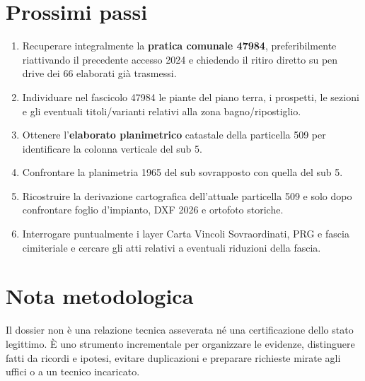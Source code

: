 \documentclass[11pt,a4paper]{article}
\begin{document}
\section{Prossimi passi}
\begin{enumerate}[leftmargin=*]
\item Recuperare integralmente la \textbf{pratica comunale 47984}, preferibilmente riattivando il precedente accesso 2024 e chiedendo il ritiro diretto su pen drive dei 66 elaborati già trasmessi.
\item Individuare nel fascicolo 47984 le piante del piano terra, i prospetti, le sezioni e gli eventuali titoli/varianti relativi alla zona bagno/ripostiglio.
\item Ottenere l'\textbf{elaborato planimetrico} catastale della particella 509 per identificare la colonna verticale del sub 5.
\item Confrontare la planimetria 1965 del sub sovrapposto con quella del sub 5.
\item Ricostruire la derivazione cartografica dell'attuale particella 509 e solo dopo confrontare foglio d'impianto, DXF 2026 e ortofoto storiche.
\item Interrogare puntualmente i layer Carta Vincoli Sovraordinati, PRG e fascia cimiteriale e cercare gli atti relativi a eventuali riduzioni della fascia.
\end{enumerate}

\section{Nota metodologica}
Il dossier non è una relazione tecnica asseverata né una certificazione dello stato legittimo. È uno strumento incrementale per organizzare le evidenze, distinguere fatti da ricordi e ipotesi, evitare duplicazioni e preparare richieste mirate agli uffici o a un tecnico incaricato.
\end{document}
